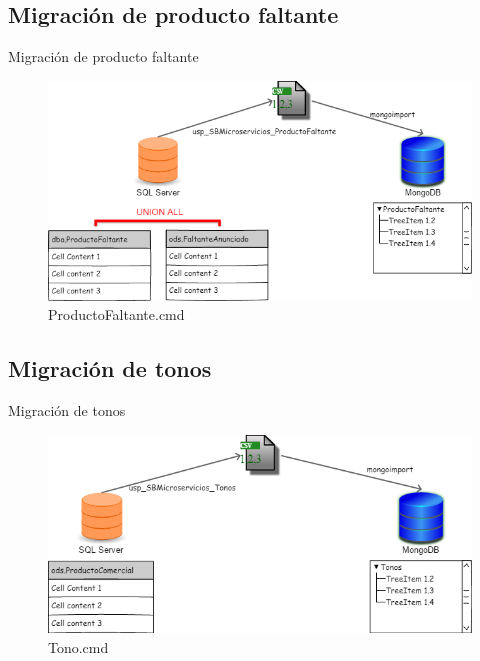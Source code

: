 \documentclass{bredelebeamer}
\begin{document}
\subsection{Migración de producto faltante}
\begin{frame}{Migración de producto faltante}
\begin{figure}
\centering
\includegraphics[scale=0.35]{imgs/ProductoFaltante.png}
\caption{ProductoFaltante.cmd}
\end{figure}
\end{frame}

\subsection{Migración de tonos}
\begin{frame}{Migración de tonos}
\begin{figure}
\centering
\includegraphics[scale=0.35]{imgs/Tonos.png}
\caption{Tono.cmd}
\end{figure}
\end{frame}
\end{document}
